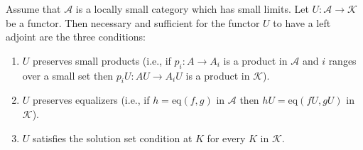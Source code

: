 Assume that $\mathcal{A}$ is a locally small category which has small limits. Let $U: \mathcal{A} \longrightarrow \mathcal{K}$ be a functor. Then necessary and sufficient for the functor $U$ to have a left adjoint are the three conditions:

\begin{enumerate}
\item $U$ preserves small products (i.e., if $p_i: A \longrightarrow A_i$ is a product in $\mathcal{A}$ and $i$ ranges over a small set then $p_i U: AU \longrightarrow A_i U$ is a product in $\mathcal{K}$).
\item $U$ preserves equalizers (i.e., if $h = \text{eq}(f, g)$ in $\mathcal{A}$ then $h U = \text{eq}(f U, g U)$ in $\mathcal{K}$).
\item $U$ satisfies the solution set condition at $K$ for every $K$ in $\mathcal{K}$.
\end{enumerate}
